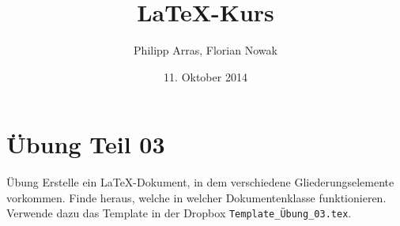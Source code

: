 \documentclass[11pt]{beamer}
\author{Philipp Arras, Florian Nowak}
\title{\LaTeX -Kurs}
\date{11. Oktober 2014}
\begin{document}


\section{Übung Teil 03}
\begin{frame}[fragile]{Übung}
Erstelle ein \LaTeX -Dokument, in dem verschiedene Gliederungselemente vorkommen. Finde heraus, welche in welcher Dokumentenklasse funktionieren.\\
Verwende dazu das Template in der Dropbox \verb|Template_Übung_03.tex|.
\end{frame}
\end{document}
